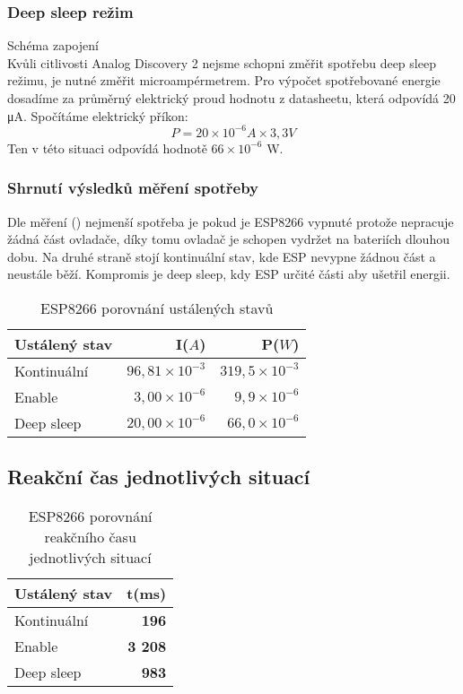 \documentclass[a4paper, 12pt]{report}
\begin{document}
				\subsubsection{Deep sleep režim}
					Schéma zapojení \\
					Kvůli citlivosti Analog Discovery 2 nejsme schopni změřit spotřebu deep sleep režimu, je nutné změřit microampérmetrem. Pro výpočet spotřebované energie dosadíme za průměrný elektrický proud hodnotu z datasheetu, která odpovídá 20 \si{\micro A}. Spočítáme elektrický příkon:
						$$P = 20\times 10^{-6} \si{A}\times 3,3 \si{V}$$
					Ten v této situaci odpovídá hodnotě $66 \times 10^{-6}$ \si{\watt}.

				\subsubsection{Shrnutí výsledků měření spotřeby}
					Dle měření () nejmenší spotřeba je pokud je ESP8266 vypnuté protože nepracuje žádná část ovladače, díky tomu ovladač je schopen vydržet na bateriích dlouhou dobu. Na druhé straně stojí kontinuální stav, kde ESP nevypne žádnou část a neustále běží. Kompromis je deep sleep, kdy ESP určité části aby ušetřil energii.

					\begin{table}[h]
						\centering
						\caption{ESP8266 porovnání ustálených stavů}
						\begin{tabular}{||l|r r||}
							\hline
							Ustálený stav & I($A$) & P($W$)\\
							\hline
							Kontinuální & $96,81 \times 10^{-3}$ & $319,5 \times 10^{-3}$\\
							Enable & $3,00\times 10^{-6}$ & $9,9 \times 10^{-6}$\\
							Deep sleep & $20,00\times 10^{-6}$ & $66,0 \times 10^{-6}$\\
							\hline
						\end{tabular}
						\label{ESP8266 klidové režimy}
					\end{table}

			\subsection{Reakční čas jednotlivých situací}

				\begin{table}[]
					\centering
					\caption{ESP8266 porovnání reakčního času jednotlivých situací}
					\begin{tabular}{||l|r||}
						\hline
						Ustálený stav & t(ms)\\
						\hline
						Kontinuální & {\bf 196}\\
						Enable & {\bf 3 208}\\
						Deep sleep & {\bf 983}\\
						\hline
					\end{tabular}
					\label{ESP8266 klidové režimy čas}
				\end{table}
\end{document}
